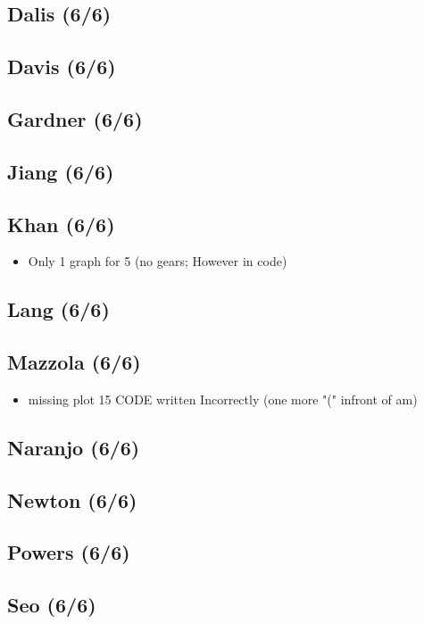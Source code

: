 \documentclass[11pt]{article}
\begin{document}
\subsection{Dalis (6/6)}
\label{sec:orgheadline6}
\subsection{Davis (6/6)}
\label{sec:orgheadline7}
\subsection{Gardner (6/6)}
\label{sec:orgheadline8}
\subsection{Jiang (6/6)}
\label{sec:orgheadline9}
\subsection{Khan (6/6)}
\label{sec:orgheadline10}
\begin{itemize}
\item Only 1 graph for 5 (no gears; However in code)
\end{itemize}
\subsection{Lang (6/6)}
\label{sec:orgheadline11}
\subsection{Mazzola (6/6)}
\label{sec:orgheadline12}
\begin{itemize}
\item missing plot 15 CODE written Incorrectly (one more "(" infront of am)
\end{itemize}
\subsection{Naranjo (6/6)}
\label{sec:orgheadline13}
\subsection{Newton (6/6)}
\label{sec:orgheadline14}
\subsection{Powers (6/6)}
\label{sec:orgheadline15}
\subsection{Seo (6/6)}
\label{sec:orgheadline16}
\end{document}
